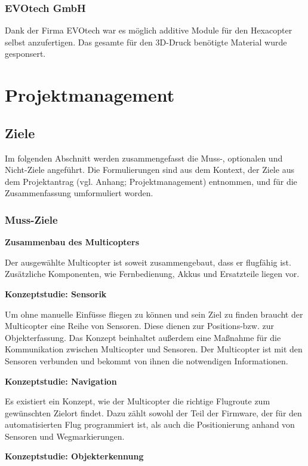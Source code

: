 \subsection*{EVOtech GmbH}
Dank der Firma {EVOtech\cite{evotech}} war es möglich additive Module für den Hexacopter selbst anzufertigen.
Das gesamte für den 3D-Druck benötigte Material wurde gesponsert.

\chapter{Projektmanagement}
\renewcommand{\kapitelautor}{Autor: Markus Kaiser}

\section{Ziele}
Im folgenden Abschnitt werden zusammengefasst die Muss-, optionalen und Nicht-Ziele angeführt.
Die Formulierungen sind aus dem Kontext, der Ziele aus dem Projektantrag (vgl. Anhang; Projektmanagement) entnommen, und für die
Zusammenfassung umformuliert worden.

  \subsection{Muss-Ziele}
  \textbf{Zusammenbau des Multicopters}

  Der ausgewählte Multicopter ist soweit zusammengebaut, dass er flugfähig ist.
  Zusätzliche Komponenten, wie Fernbedienung, Akkus und Ersatzteile liegen vor.

  \textbf{Konzeptstudie: Sensorik}

  Um ohne manuelle Einfüsse fliegen zu können und sein Ziel zu finden braucht der Multicopter eine Reihe
  von Sensoren. Diese dienen zur Positions-bzw. zur Objekterfassung. Das Konzept beinhaltet außerdem eine
  Maßnahme für die Kommunikation zwischen Multicopter und Sensoren.
  Der Multicopter ist mit den Sensoren verbunden und bekommt von ihnen die notwendigen Informationen.

  \textbf{Konzeptstudie: Navigation}

  Es existiert ein Konzept, wie der Multicopter die richtige Flugroute zum gewünschten
  Zielort findet. Dazu zählt sowohl der Teil der Firmware, der für den automatisierten Flug programmiert ist,
  als auch die Positionierung anhand von Sensoren und Wegmarkierungen.

  \textbf{Konzeptstudie: Objekterkennung}

